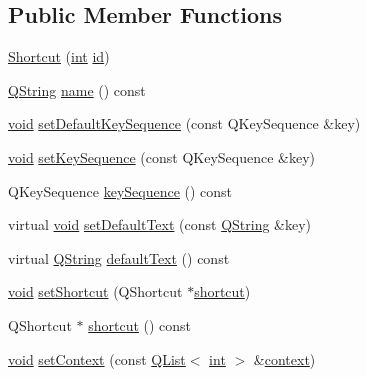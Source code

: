 \subsection*{Public Member Functions}
\begin{DoxyCompactItemize}
\item 
\hyperlink{group___core_plugin_ga48cb263cbfb499d8cb9b6d536b002bc7}{Shortcut} (\hyperlink{ioapi_8h_a787fa3cf048117ba7123753c1e74fcd6}{int} \hyperlink{glext_8h_a58c2a664503e14ffb8f21012aabff3e9}{id})
\item 
\hyperlink{group___u_a_v_objects_plugin_gab9d252f49c333c94a72f97ce3105a32d}{Q\-String} \hyperlink{group___core_plugin_ga7ec7f71adfdc3c6b35e6170469379326}{name} () const 
\item 
\hyperlink{group___u_a_v_objects_plugin_ga444cf2ff3f0ecbe028adce838d373f5c}{void} \hyperlink{group___core_plugin_gaa079869e33f968d489f8db585bf751f1}{set\-Default\-Key\-Sequence} (const Q\-Key\-Sequence \&key)
\item 
\hyperlink{group___u_a_v_objects_plugin_ga444cf2ff3f0ecbe028adce838d373f5c}{void} \hyperlink{group___core_plugin_ga20c5a7f37d12f285984afd56cabe133a}{set\-Key\-Sequence} (const Q\-Key\-Sequence \&key)
\item 
Q\-Key\-Sequence \hyperlink{group___core_plugin_gab1e3a78b0e8f9b7f8d8f586aecc0634c}{key\-Sequence} () const 
\item 
virtual \hyperlink{group___u_a_v_objects_plugin_ga444cf2ff3f0ecbe028adce838d373f5c}{void} \hyperlink{group___core_plugin_gaef3954d263a7c24936207d8c45b45aa7}{set\-Default\-Text} (const \hyperlink{group___u_a_v_objects_plugin_gab9d252f49c333c94a72f97ce3105a32d}{Q\-String} \&key)
\item 
virtual \hyperlink{group___u_a_v_objects_plugin_gab9d252f49c333c94a72f97ce3105a32d}{Q\-String} \hyperlink{group___core_plugin_ga29a73f08bcec4b0ff2ce91efa7c49a74}{default\-Text} () const 
\item 
\hyperlink{group___u_a_v_objects_plugin_ga444cf2ff3f0ecbe028adce838d373f5c}{void} \hyperlink{group___core_plugin_gaa0e0fd029473e19b4eb09270e581fd90}{set\-Shortcut} (Q\-Shortcut $\ast$\hyperlink{group___core_plugin_ga0a8d9dc0a089aa779ff29b23b1cd895f}{shortcut})
\item 
Q\-Shortcut $\ast$ \hyperlink{group___core_plugin_ga0a8d9dc0a089aa779ff29b23b1cd895f}{shortcut} () const 
\item 
\hyperlink{group___u_a_v_objects_plugin_ga444cf2ff3f0ecbe028adce838d373f5c}{void} \hyperlink{group___core_plugin_ga18f3c41267657c81803ed196d33e3e99}{set\-Context} (const \hyperlink{class_q_list}{Q\-List}$<$ \hyperlink{ioapi_8h_a787fa3cf048117ba7123753c1e74fcd6}{int} $>$ \&\hyperlink{group___core_plugin_ga1e8dc09d7c244c60c76b7f1172d06306}{context})

\end{DoxyCompactItemize}
